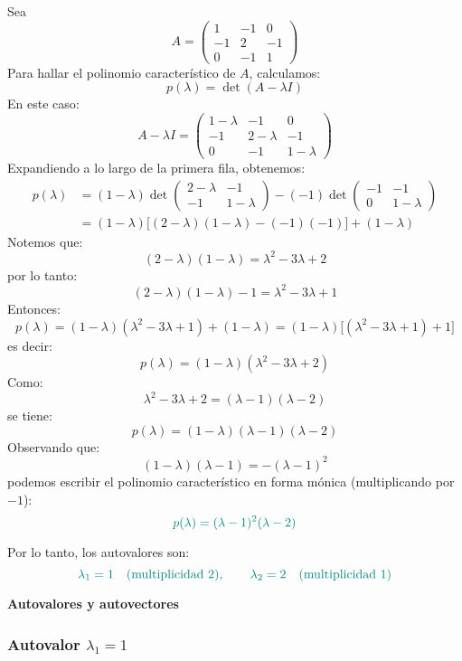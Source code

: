\documentclass{article}
\begin{document}
\begin{enumerate}[label=\textbf{\alph*)}]
Sea
\[
A =
\begin{pmatrix}
1 & -1 & 0\\
-1 & 2 & -1\\
0 & -1 & 1
\end{pmatrix}
\]
Para hallar el polinomio característico de \(A\), calculamos:
\[
p(\lambda) = \det(A - \lambda I)
\]
En este caso:
\[
A - \lambda I =
\begin{pmatrix}
1-\lambda & -1 & 0\\
-1 & 2-\lambda & -1\\
0 & -1 & 1-\lambda
\end{pmatrix}
\]
Expandiendo a lo largo de la primera fila, obtenemos:
\[
\begin{aligned}
p(\lambda)
&= (1-\lambda)\det\begin{pmatrix}2-\lambda & -1\\-1 & 1-\lambda\end{pmatrix}
- (-1)\det\begin{pmatrix}-1 & -1\\0 & 1-\lambda\end{pmatrix}\\[4pt]
&= (1-\lambda)\Big[(2-\lambda)(1-\lambda) - (-1)(-1)\Big] + (1-\lambda)
\end{aligned}
\]
Notemos que:
\[
(2-\lambda)(1-\lambda) = \lambda^2 - 3\lambda + 2
\]
por lo tanto:
\[
(2-\lambda)(1-\lambda) - 1 = \lambda^2 - 3\lambda + 1
\]
Entonces:
\[
p(\lambda) = (1-\lambda)(\lambda^2 - 3\lambda + 1) + (1-\lambda)
= (1-\lambda)\Big[(\lambda^2 - 3\lambda + 1) + 1\Big]
\]
es decir:
\[
p(\lambda) = (1-\lambda)(\lambda^2 - 3\lambda + 2)
\]
Como:
\[
\lambda^2 - 3\lambda + 2 = (\lambda-1)(\lambda-2)
\]
se tiene:
\[
p(\lambda) = (1-\lambda)(\lambda-1)(\lambda-2)
\]
Observando que:
\[
(1-\lambda)(\lambda-1) = -(\lambda-1)^2
\]
podemos escribir el polinomio característico en forma mónica (multiplicando por \(-1\)):
\[
\color{teal}
p(\lambda) = (\lambda-1)^2(\lambda-2)
\]

Por lo tanto, los autovalores son:
\[
\color{teal}
\lambda_1 = 1\quad (\text{multiplicidad } 2),
\qquad
\lambda_2 = 2\quad (\text{multiplicidad } 1)
\]

\textbf{Autovalores y autovectores}

\subsubsection*{Autovalor \(\lambda_1 = 1\)}


\end{enumerate}
\end{document}

